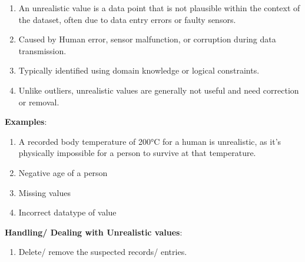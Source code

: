 \begin{enumerate}
    \item An unrealistic value is a data point that is not plausible within the context of the dataset, often due to data entry errors or faulty sensors. \hfill \cite{common/online/chatgpt}

    \item Caused by Human error, sensor malfunction, or corruption during data transmission. \hfill \cite{common/online/chatgpt}

    \item Typically identified using domain knowledge or logical constraints. \hfill \cite{common/online/chatgpt}

    \item Unlike outliers, unrealistic values are generally not useful and need correction or removal. \hfill \cite{common/online/chatgpt}

\end{enumerate}

\vspace{0.3cm}

\textbf{Examples}:
\begin{enumerate}
    \item A recorded body temperature of 200°C for a human is unrealistic, as it’s physically impossible for a person to survive at that temperature. \hfill \cite{common/online/chatgpt}

    \item Negative age of a person \hfill \cite{common/online/chatgpt}

    \item Missing values \hfill \cite{statistics/book/Statistics-for-Data-Scientists/Maurits-Kaptein}

    \item Incorrect datatype of value \hfill \cite{statistics/book/Statistics-for-Data-Scientists/Maurits-Kaptein}
\end{enumerate}

\vspace{0.3cm}
\textbf{Handling/ Dealing with Unrealistic values}:
\begin{enumerate}
    \item Delete/ remove the suspected records/ entries. \hfill \cite{statistics/book/Statistics-for-Data-Scientists/Maurits-Kaptein}

\end{enumerate}





